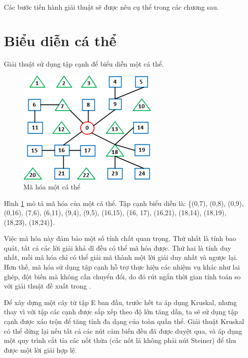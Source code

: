 Các bước tiến hành giải thuật sẽ được nêu cụ thể trong các chương sau.

\section{Biểu diễn cá thể}
Giải thuật sử dụng tập cạnh để biểu diễn một cá thể.

\begin{figure}
	\centering
	\includegraphics[scale=1.0]{figures/graph}
	\caption{Mã hóa một cá thể}\label{fig:encode}
\end{figure}

Hình \ref{fig:encode} mô tả mã hóa của một cá thể. Tập cạnh biểu diễn là: \{(0,7), (0,8), (0,9), (0,16), (7,6), (6,11), (9,4), (9,5), (16,15), (16, 17), (16,21), (18,14), (18,19), (18,23), (18,24)\}.


Việc mã hóa này đảm bảo một số tính chất quan trọng. Thứ nhất là tính bao quát, tất cả các lời giải khả dĩ đều có thể mã hóa được. Thứ hai là tính duy nhất, mỗi mã hóa chỉ có thể giải mã thành một lời giải duy nhất và ngược lại. Hơn thế, mã hóa sử dụng tập cạnh hỗ trợ thực hiện các nhiệm vụ khác như lai ghép, đột biến mà không cần chuyển đổi, do đó rút ngắn thời gian tính toán so với giải thuật đề xuất trong \cite{lu2014construction}.


Để xây dựng một cây từ tập E ban đầu, trước hết ta áp dụng Kruskal, nhưng thay vì với tập các cạnh được sắp xếp theo độ lớn tăng dần, ta sẽ sử dụng tập cạnh được xáo trộn để tăng tính đa dạng của toàn quần thể. Giải thuật Kruskal có thể dừng lại nếu tất cả các nút cảm biến đều đã được duyệt qua, và áp dụng một quy trình cắt tỉa các nốt thừa (các nốt lá không phải nút Steiner) để thu được một lời giải hợp lệ.
